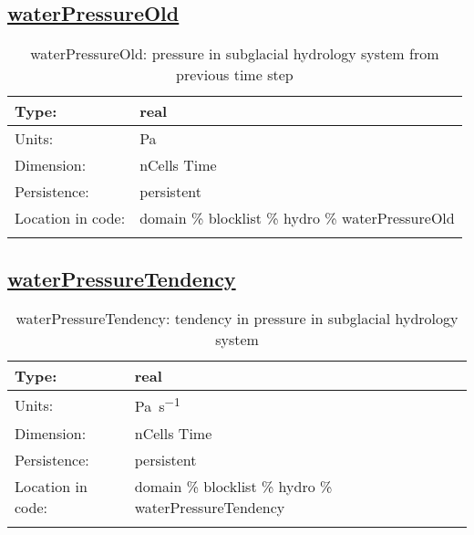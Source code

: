 \subsection[waterPressureOld]{\hyperref[sec:var_tab_hydro]{waterPressureOld}}
\label{subsec:var_sec_hydro_waterPressureOld}
\begin{center}
\begin{longtable}{| p{2.0in} | p{4.0in} |}
        \hline 
        Type: & real \\
        \hline 
        Units: & \si{Pa} \\
        \hline 
        Dimension: & nCells Time \\
        \hline 
        Persistence: & persistent \\
        \hline 
         Location in code: & domain \% blocklist \% hydro \% waterPressureOld \\
         \hline 
    \caption{waterPressureOld: pressure in subglacial hydrology system from previous time step}
\end{longtable}
\end{center}
\subsection[waterPressureTendency]{\hyperref[sec:var_tab_hydro]{waterPressureTendency}}
\label{subsec:var_sec_hydro_waterPressureTendency}
\begin{center}
\begin{longtable}{| p{2.0in} | p{4.0in} |}
        \hline 
        Type: & real \\
        \hline 
        Units: & \si{Pa.s^{-1}} \\
        \hline 
        Dimension: & nCells Time \\
        \hline 
        Persistence: & persistent \\
        \hline 
         Location in code: & domain \% blocklist \% hydro \% waterPressureTendency \\
         \hline 
    \caption{waterPressureTendency: tendency in pressure in subglacial hydrology system}
\end{longtable}
\end{center}
